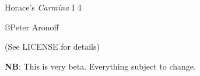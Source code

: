 \begin{titlepage}

\begin{center}

\huge Horace's \textit{Carmina} I 4

\vskip2in

\large \copyright Peter Aronoff \the\year

(See LICENSE for details)

\vskip1in

\textbf{NB}: This is very beta. Everything subject to change.

\vskip2in

\newpage

\end{center}

\end{titlepage}
